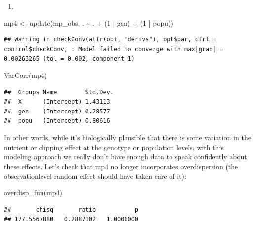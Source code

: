 \documentclass[
  12pt,
]{book}
\newenvironment{Shaded}{\begin{snugshade}}{\end{snugshade}}
\newcommand{\DecValTok}[1]{\textcolor[rgb]{0.00,0.00,0.81}{#1}}
\newcommand{\FunctionTok}[1]{\textcolor[rgb]{0.00,0.00,0.00}{#1}}
\newcommand{\NormalTok}[1]{#1}
\newcommand{\OtherTok}[1]{\textcolor[rgb]{0.56,0.35,0.01}{#1}}
\newcommand{\SpecialCharTok}[1]{\textcolor[rgb]{0.00,0.00,0.00}{#1}}
\providecommand{\tightlist}{%
  \setlength{\itemsep}{0pt}\setlength{\parskip}{0pt}}
\begin{document}
\begin{enumerate}
\def\labelenumi{\arabic{enumi}.}
\setcounter{enumi}{2}
\tightlist
\item
\end{enumerate}

\begin{Shaded}
\begin{Highlighting}[]
\NormalTok{mp4 }\OtherTok{\textless{}{-}} \FunctionTok{update}\NormalTok{(mp\_obs, . }\SpecialCharTok{\textasciitilde{}}\NormalTok{ . }\SpecialCharTok{+}\NormalTok{ (}\DecValTok{1} \SpecialCharTok{|}\NormalTok{ gen) }\SpecialCharTok{+}\NormalTok{ (}\DecValTok{1} \SpecialCharTok{|}\NormalTok{ popu))}
\end{Highlighting}
\end{Shaded}

\begin{verbatim}
## Warning in checkConv(attr(opt, "derivs"), opt$par, ctrl = control$checkConv, : Model failed to converge with max|grad| = 0.00263265 (tol = 0.002, component 1)
\end{verbatim}

\begin{Shaded}
\begin{Highlighting}[]
\FunctionTok{VarCorr}\NormalTok{(mp4)}
\end{Highlighting}
\end{Shaded}

\begin{verbatim}
##  Groups Name        Std.Dev.
##  X      (Intercept) 1.43113 
##  gen    (Intercept) 0.28577 
##  popu   (Intercept) 0.80616
\end{verbatim}

In other words, while it's biologically plausible that there is some variation in the nutrient or clipping effect at the genotype or population levels, with this modeling approach we really don't have enough data to speak confidently about these effects.
Let's check that mp4 no longer incorporates overdispersion (the observationlevel random effect should have taken care of it):

\begin{Shaded}
\begin{Highlighting}[]
\FunctionTok{overdisp\_fun}\NormalTok{(mp4)}
\end{Highlighting}
\end{Shaded}

\begin{verbatim}
##       chisq       ratio           p 
## 177.5567880   0.2887102   1.0000000
\end{verbatim}
\end{document}

